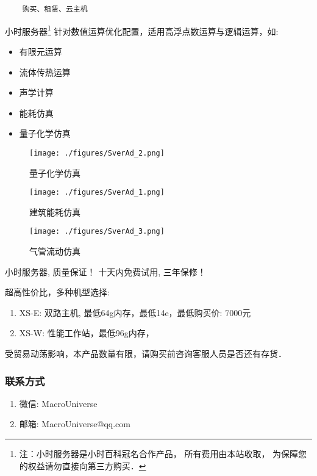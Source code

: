 
\begin{issues}
\issueDraft
\end{issues}



\begin{lstlisting}
    购买、租赁、云主机
\end{lstlisting}

小时服务器\footnote{注：小时服务器是小时百科冠名合作产品， 所有费用由本站收取， 为保障您的权益请勿直接向第三方购买．} 针对数值运算优化配置，适用高浮点数运算与逻辑运算，如:
\begin{itemize}
\item 有限元运算
\item 流体传热运算
\item 声学计算
\item 能耗仿真
\item 量子化学仿真
\end{itemize}
\begin{figure}[ht]
\centering
\texttt{[image: ./figures/SverAd\_2.png]}
\caption{量子化学仿真} \label{SverAd_fig2}
\end{figure}
\begin{figure}[ht]
\centering
\texttt{[image: ./figures/SverAd\_1.png]}
\caption{建筑能耗仿真} \label{SverAd_fig1}
\end{figure}
\begin{figure}[ht]
\centering
\texttt{[image: ./figures/SverAd\_3.png]}
\caption{气管流动仿真} \label{SverAd_fig3}
\end{figure}

小时服务器, 质量保证！ 十天内免费试用, 三年保修！

超高性价比，多种机型选择:
\begin{enumerate}
\item XS-E: 双路主机, 最低64g内存，最低14e，最低购买价: 7000元
\item XS-W: 性能工作站，最低96g内存，

\end{enumerate}

受贸易动荡影响，本产品数量有限，请购买前咨询客服人员是否还有存货．
\subsubsection{联系方式}
\begin{enumerate}
\item 微信: MacroUniverse
\item 邮箱: MacroUniverse@qq.com
\end{enumerate}


